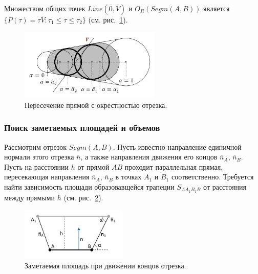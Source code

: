 Множеством общих точек $Line(\overline{0}, \overline{V})$ и $O_R(Segm(A, B))$ является $\{ \overline{P}(\tau) = \tau \overline{V}: \tau_1 \le \tau \le \tau_2 \}$ (см. рис.~\ref{fig:text_1_geo_prim_spheres_nest_intersection}).

\begin{figure}[ht]
\centering
\includegraphics[width=0.6\textwidth]{./pics/text_1_geo_prim/spheres_nest_intersection.pdf}
\singlespacing
{}\caption{Пересечение прямой с окрестностью отрезка.}
\label{fig:text_1_geo_prim_spheres_nest_intersection}
\end{figure}

\subsubsection{Поиск заметаемых площадей и объемов}\label{sec:text_1_geo_prim_volume}

Рассмотрим отрезок $Segm(A, B)$.
Пусть известно направление единичной нормали этого отрезка $\overline{n}$, а также направления движения его концов $\overline{n}_A$, $\overline{n}_B$.
Пусть на расстоянии $h$ от прямой $AB$ проходит параллельная прямая, пересекающая направления $\overline{n}_A$, $\overline{n}_B$ в точках $A_1$ и $B_1$ соответственно.
Требуется найти зависимость площади образовавщейся трапеции $S_{AA_1B_1B}$ от расстояния между прямыми $h$ (см. рис.~\ref{fig:text_1_geo_prim_trapezoid_partial}).

\begin{figure}[ht]
\centering
\includegraphics[width=0.45\textwidth]{./pics/text_1_geo_prim/trapezoid_partial.pdf}
\singlespacing
{}\caption{Заметаемая площадь при движении концов отрезка.}
\label{fig:text_1_geo_prim_trapezoid_partial}
\end{figure}

